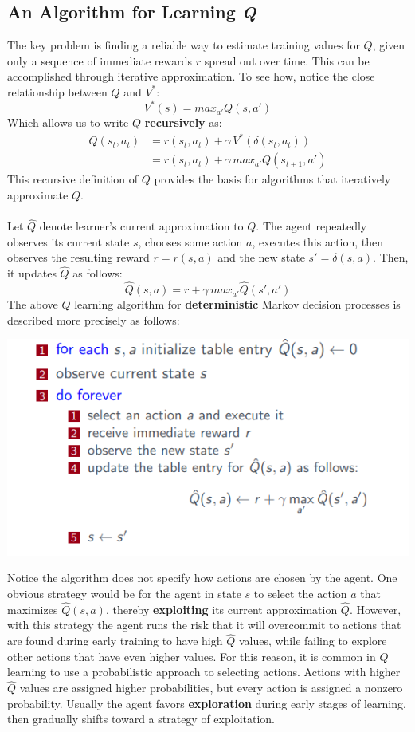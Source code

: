\subsection{An Algorithm for Learning \textit{Q}}
The key problem  is finding a reliable way to  estimate training  values for $Q$, given  only a sequence of immediate rewards $r$ spread out over time. This can be accomplished through  iterative approximation. To see how,  notice the  close relationship between $Q$ and $V^*$:
\[V^*(s) = max_{a'}Q(s, a')\]
Which allows us to write $Q$ \textbf{recursively} as:
\[
\begin{split}
    Q(s_t, a_t) & = r(s_t, a_t) + \gamma \, V^*(\delta(s_t, a_t))\\
    & = r(s_t, a_t) + \gamma \, max_{a'}Q(s_{t+1}, a')
\end{split}
\]
This recursive definition of $Q$ provides the basis for algorithms that iteratively approximate $Q$.\\\\
Let $\hat{Q}$ denote learner’s current approximation to $Q$. The agent repeatedly observes its current state $s$, chooses some action $a$, executes this action, then observes the resulting reward $r = r(s, a)$ and the new state $s' = \delta(s, a)$. Then, it updates $\hat{Q}$ as follows:
\[\hat{Q}(s,a) = r + \gamma \, max_{a'}\hat{Q}(s', a')\]
The above $Q$ learning algorithm for \textbf{deterministic} Markov decision processes is described more precisely as follows:
\begin{center}
    \includegraphics[]{images/Q-learning.png}
\end{center}
Notice the algorithm does not specify how actions are chosen by the agent. One obvious strategy would be for the agent in state $s$ to select the action $a$ that maximizes $\hat{Q}(s, a)$, thereby \textbf{exploiting} its current approximation $\hat{Q}$.  However, with  this strategy the agent runs the risk that it will overcommit to actions  that are found during early training to have high $\hat{Q}$ values, while failing to explore other actions that have even higher values. For this reason, it is common in $Q$ learning to use a probabilistic approach to selecting actions.  Actions with higher $\hat{Q}$ values are assigned higher probabilities, but every action is assigned a nonzero probability. Usually the agent favors \textbf{exploration} during early stages of learning, then gradually shifts toward a strategy of exploitation.
